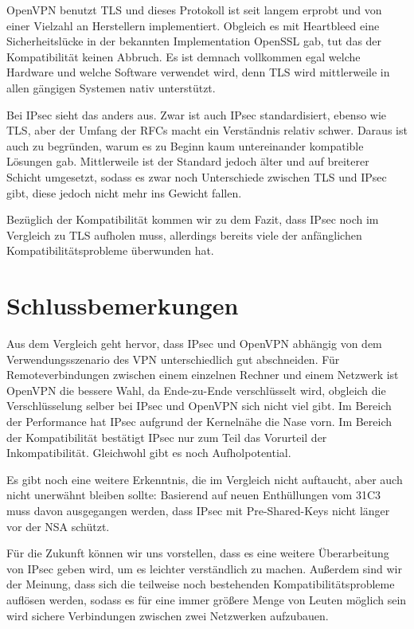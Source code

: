 \documentclass[12pt]{scrartcl}
\begin{document}
OpenVPN benutzt TLS und dieses Protokoll ist seit langem erprobt und von einer Vielzahl an Herstellern implementiert. Obgleich es mit Heartbleed eine Sicherheitslücke in der bekannten Implementation OpenSSL gab, tut das der Kompatibilität keinen Abbruch. Es ist demnach vollkommen egal welche Hardware und welche Software verwendet wird, denn TLS wird mittlerweile in allen gängigen Systemen nativ unterstützt.

Bei IPsec sieht das anders aus. Zwar ist auch IPsec standardisiert, ebenso wie TLS, aber der Umfang der RFCs macht ein Verständnis relativ schwer. Daraus ist auch zu begründen, warum es zu Beginn kaum untereinander kompatible Lösungen gab\cite{Alshamsi2005}. Mittlerweile ist der Standard jedoch älter und auf breiterer Schicht umgesetzt, sodass es zwar noch Unterschiede zwischen TLS und IPsec gibt, diese jedoch nicht mehr ins Gewicht fallen.

Bezüglich der Kompatibilität kommen wir zu dem Fazit, dass IPsec noch im Vergleich zu TLS aufholen muss, allerdings bereits viele der anfänglichen Kompatibilitätsprobleme überwunden hat.

\section{Schlussbemerkungen}
Aus dem Vergleich geht hervor, dass IPsec und OpenVPN abhängig von dem Verwendungsszenario des VPN unterschiedlich gut abschneiden. Für Remoteverbindungen zwischen einem einzelnen Rechner und einem Netzwerk ist OpenVPN die bessere Wahl, da Ende-zu-Ende verschlüsselt wird, obgleich die Verschlüsselung selber bei IPsec und OpenVPN sich nicht viel gibt. Im Bereich der Performance hat IPsec aufgrund der Kernelnähe die Nase vorn. Im Bereich der Kompatibilität bestätigt IPsec nur zum Teil das Vorurteil der Inkompatibilität. Gleichwohl gibt es noch Aufholpotential.

Es gibt noch eine weitere Erkenntnis, die im Vergleich nicht auftaucht, aber auch nicht unerwähnt bleiben sollte: Basierend auf neuen Enthüllungen vom 31C3 muss davon ausgegangen werden, dass IPsec mit Pre-Shared-Keys nicht länger vor der NSA schützt.

Für die Zukunft können wir uns vorstellen, dass es eine weitere Überarbeitung von IPsec geben wird, um es leichter verständlich zu machen. Außerdem sind wir der Meinung, dass sich die teilweise noch bestehenden Kompatibilitätsprobleme auflösen werden, sodass es für eine immer größere Menge von Leuten möglich sein wird sichere Verbindungen zwischen zwei Netzwerken aufzubauen.
\end{document}
